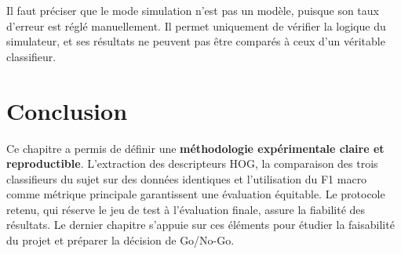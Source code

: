 Il faut préciser que le mode \og simulation \fg{} n'est pas un modèle, puisque son taux d'erreur est réglé manuellement. Il permet uniquement de vérifier la logique du simulateur, et ses résultats ne peuvent pas être comparés à ceux d'un véritable classifieur.

\section{Conclusion}

Ce chapitre a permis de définir une \textbf{méthodologie expérimentale claire et reproductible}. L'extraction des descripteurs HOG, la comparaison des trois classifieurs du sujet sur des données identiques et l'utilisation du F1 macro comme métrique principale garantissent une évaluation équitable. Le protocole retenu, qui réserve le jeu de test à l'évaluation finale, assure la fiabilité des résultats. Le dernier chapitre s'appuie sur ces éléments pour étudier la faisabilité du projet et préparer la décision de Go/No-Go.
